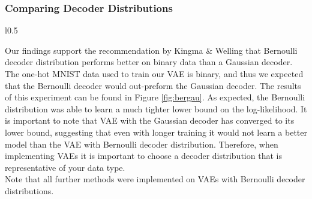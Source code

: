 \documentclass{article} %
\begin{document}
\subsubsection{Comparing Decoder Distributions}
\begin{wrapfigure}{l}{0.5\textwidth}
\captionsetup{justification=centering}
    \resizebox{\linewidth}{!}{}
    \caption{Bernoulli v.s Gaussian decoder distributions}
    \label{fig:bergau}
  \end{wrapfigure}
Our findings support the recommendation by Kingma \& Welling that Bernoulli decoder distribution performs better on binary data than a Gaussian decoder. The one-hot MNIST data used to train our VAE is binary, and thus we expected that the Bernoulli decoder would out-preform the Gaussian decoder. The results of this experiment can be found in Figure \ref{fig:bergau}. As expected, the Bernoulli distribution was able to learn a much tighter lower bound on the log-likelihood. It is important to note that VAE with the Gaussian decoder has converged to its lower bound, suggesting that even with longer training it would not learn a better model than the VAE with Bernoulli decoder distribution. Therefore, when implementing VAEs it is important to choose a decoder distribution that is representative of your data type. \\
Note that all further methods were implemented on VAEs with Bernoulli decoder distributions.
\end{document}
